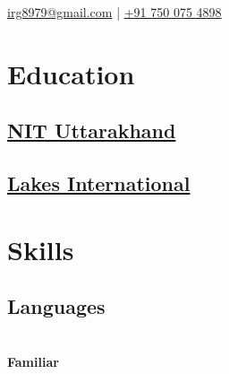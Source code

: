 \documentclass[]{deedy-resume-openfont}
\begin{document}
%
%

%
%


 {
\href{mailto:irg8979@gmail.com}{irg8979@gmail.com} | 
\href{tel:+917500754898}{+91 750 075 4898}
}

%
%

\begin{minipage}[t]{0.33\textwidth} 


\section{Education} 

\subsection{\href{http://nituk.ac.in}{NIT Uttarakhand}}
\sectionsep

\subsection{\href{http://www.lisbhimtal.org/index.php}{Lakes International}}
\sectionsep


\section{Skills}
\subsection{Languages}
 \\ 
\textbf{Familiar}
\sectionsep


\end{minipage}
\end{document}
